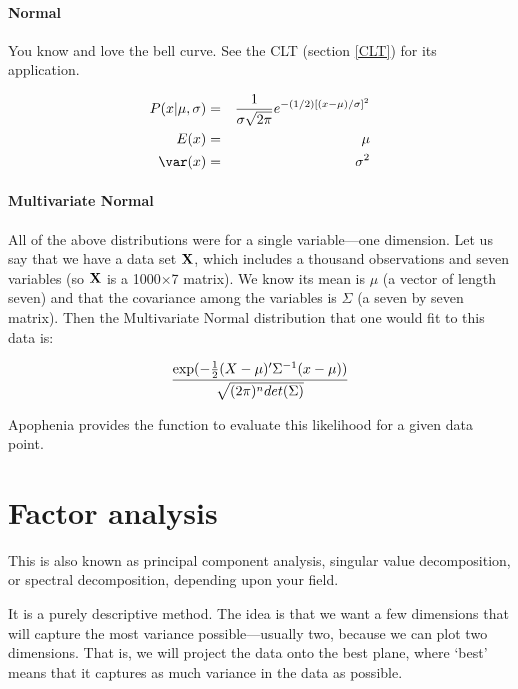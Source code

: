 \paragraph{Normal}

You know and love the bell curve. See the CLT (section \ref{CLT}) for
its application.

\begin{eqnarray}					\label{normal}
P(x|\mu,\sigma)&=&{1\over \sigma\sqrt{2\pi}} e^{-(1/2)[(x-\mu)/\sigma]^2}\\ 
E(x)&=&\mu							\nonumber\\
\var(x)&=&\sigma^2						\nonumber
\end{eqnarray}

\paragraph{Multivariate Normal}
All of the above distributions were for a single variable---one
dimension. Let us say that we have a data set ${\bf X}$, which includes a
thousand observations and seven variables (so ${\bf X}$ is a 1000$\times$7
matrix). We know its mean is
$\mu$ (a vector of length seven) and that the covariance among the
variables is $\Sigma$ (a seven by seven matrix). Then the Multivariate
Normal distribution that one would fit to this data is:

\begin{eqnarray}					
{\exp(-{1\over 2} (X-\mu)' \Sigma^{-1} (x-\mu)) 
\over
   \sqrt{(2 \pi)^n det(\Sigma)}}
\end{eqnarray}					

Apophenia provides the function  to evaluate this likelihood for a given data point.



\section{Factor analysis} \label{pca} 
This is also known as principal component
analysis, singular value decomposition, or spectral decomposition, depending upon your field. 

It is a purely descriptive method.  The idea is that we want a few
dimensions that will capture the most variance possible---usually two,
because we can plot two dimensions. That is, we will project the data
onto the best plane, where `best' means that it captures as much
variance in the data as possible.

